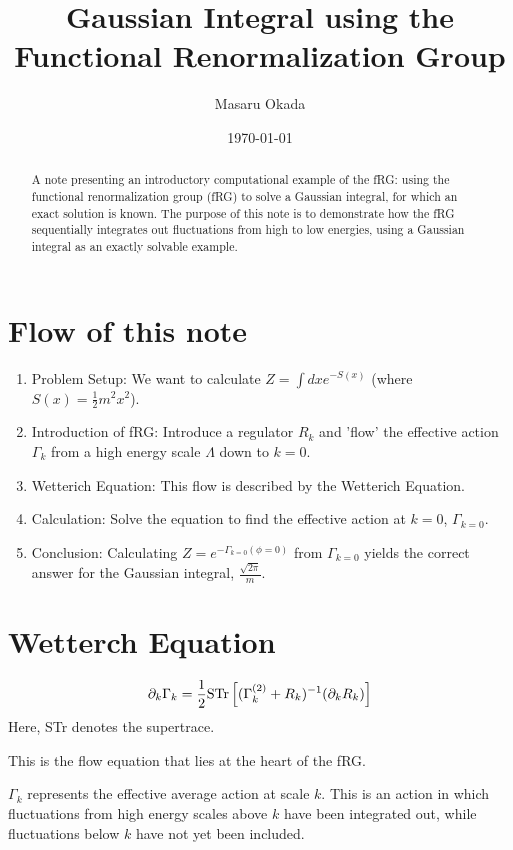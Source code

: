 \documentclass[uplatex,a4j,12pt,dvipdfmx]{jsarticle}
\title{
Gaussian Integral using the Functional Renormalization Group
}
\author{Masaru Okada}
\date{\today}
\begin{document}
\maketitle

\begin{abstract}
	A note presenting an introductory computational example of the fRG:
	using the functional renormalization group (fRG) to solve a Gaussian integral,
	for which an exact solution is known.
	The purpose of this note is to demonstrate how the fRG sequentially integrates out
	fluctuations from high to low energies, using a Gaussian integral as an
	exactly solvable example.
\end{abstract}

\tableofcontents
\section{Flow of this note}

\begin{enumerate}
	\item Problem Setup: We want to calculate $Z = \int dx e^{-S(x)}$ (where $S(x) = \frac{1}{2}m^2 x^2$).
	\item Introduction of fRG: Introduce a regulator $R_k$ and 'flow' the effective action $\Gamma_k$ from a high energy scale $\Lambda$ down to $k=0$.
	\item Wetterich Equation: This flow is described by the Wetterich Equation.
	\item Calculation: Solve the equation to find the effective action at $k=0$, $\Gamma_{k=0}$.
	\item Conclusion: Calculating $Z = e^{-\Gamma_{k=0}(\phi=0)}$ from $\Gamma_{k=0}$ yields the correct answer for the Gaussian integral, $\frac{\sqrt{2\pi}}{m}$.
\end{enumerate}

\section{Wetterch Equation}

\[
	\partial_{k} \Gamma_{k}
	=
	\frac{1}{2} {\rm STr} \left[ (\Gamma^{(2)}_{k} + R_{k})^{-1} (\partial_{k} R_{k}) \right]
\]
Here, STr denotes the supertrace.

This is the flow equation that lies at the heart of the fRG.

$\Gamma_{k}$ represents the effective average action at scale $k$.
This is an action in which fluctuations from high energy scales above $k$ have been integrated out,
while fluctuations below $k$ have not yet been included.
\end{document}
